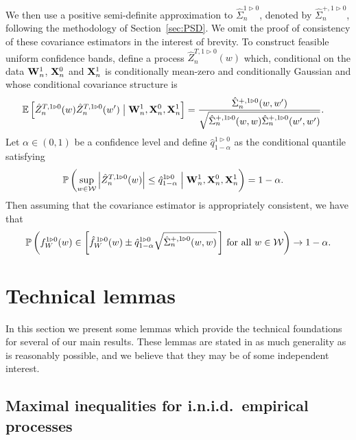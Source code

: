 %
We then use a positive semi-definite approximation to
$\hat\Sigma_n^{1 \triangleright 0}$, denoted by
$\hat\Sigma_n^{+, 1 \triangleright 0}$,
following the methodology of
Section~\ref{sec:PSD}.
We omit the proof of consistency of these covariance estimators
in the interest of brevity.
To construct feasible uniform confidence bands,
define a process $\hat Z_n^{T, 1 \triangleright 0}(w)$ which,
conditional on the data $\mathbf{W}_n^1$, $\mathbf{X}_n^0$ and $\mathbf{X}_n^1$
is conditionally mean-zero and conditionally Gaussian and whose
conditional covariance structure is
%
\begin{align*}
  \mathbb{E}\left[
    \hat Z_n^{T, 1 \triangleright 0}(w)
    \hat Z_n^{T, 1 \triangleright 0}(w')
  \bigm| \mathbf{W}_n^1, \mathbf{X}_n^0, \mathbf{X}_n^1 \right]
  &=
  \frac{\hat \Sigma_n^{+, 1 \triangleright 0}(w,w')}
  {\sqrt{\hat \Sigma_n^{+, 1 \triangleright 0}(w,w)
  \hat \Sigma_n^{+, 1 \triangleright 0}(w',w')}}.
\end{align*}
%
Let $\alpha \in (0,1)$ be a confidence level and define
$\hat q_{1-\alpha}^{1 \triangleright 0}$
as the conditional quantile satisfying
%
\begin{align*}
  \mathbb{P}\left(
    \sup_{w \in \mathcal{W}}
    \left| \hat Z_n^{T, 1 \triangleright 0}(w) \right|
    \leq \hat q_{1-\alpha}^{1 \triangleright 0}
    \Bigm\vert \mathbf{W}_n^1, \mathbf{X}_n^0, \mathbf{X}_n^1
  \right)
  &=
  1 - \alpha.
\end{align*}
%
Then assuming that the covariance estimator is appropriately consistent,
we have that
%
\begin{align*}
  \mathbb{P}\left(
    f_W^{1 \triangleright 0}(w)
    \in
    \left[
      \hat f_W^{\,1 \triangleright 0}(w)
      \pm
      \hat q^{1 \triangleright 0}_{1-\alpha}
      \sqrt{\hat\Sigma_n^{+, 1 \triangleright 0}(w,w)}
    \,\right]
    \,\textup{for all }
    w \in \mathcal{W}
  \right)
  \to 1 - \alpha.
\end{align*}

\section{Technical lemmas}

In this section we present some lemmas which provide the
technical foundations for several of our main results.
These lemmas are stated in as much generality
as is reasonably possible,
and we believe that they may be
of some independent interest.

\subsection{Maximal inequalities for i.n.i.d.\ empirical processes}

